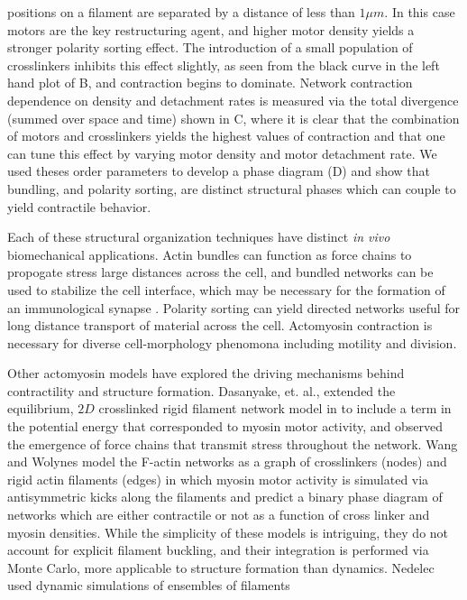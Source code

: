\documentclass[12pt]{article}
\begin{document}
positions on a filament are separated by a distance of less than $1\mu m$. 
In this case motors are the key restructuring agent, and higher motor density
yields a stronger polarity sorting effect. The introduction of a small 
population of crosslinkers inhibits this effect slightly, as seen from the black
curve in the left hand plot of B, and contraction begins to 
dominate. Network contraction dependence on density and detachment rates 
is measured via the total divergence (summed over space and time) 
shown in C, where it is clear that the combination of 
motors and crosslinkers yields the highest values of contraction and that one
can tune this effect by varying motor density and motor detachment rate. 
We used theses order parameters to develop a phase diagram (D)
and show that bundling, and polarity sorting, are distinct structural phases
which can couple to yield contractile behavior. 
\par
Each of these structural organization techniques have distinct {\em in vivo}
biomechanical applications. 
Actin bundles can function as force chains to propogate stress large distances
across the cell, and bundled networks can be used to stabilize the cell 
interface, which may be necessary for the formation of an immunological synapse 
\cite{comrie2015}. Polarity sorting can yield directed networks useful for long 
distance transport of 
material across the cell. Actomyosin contraction is necessary for diverse
cell-morphology phenomona including motility and division.
\par
Other actomyosin models have explored the driving mechanisms behind
contractility and structure formation. Dasanyake, et. al., extended the
equilibrium, $2D$ crosslinked rigid filament network model in \cite{head2003} to
include a term in the potential energy that corresponded to myosin motor
activity, and observed the emergence of force chains that transmit stress
throughout the network\cite{dasanyake2011}. Wang and Wolynes \cite{wang2012}
model the F-actin networks as a graph of crosslinkers (nodes) and rigid actin
filaments (edges) in which myosin motor activity is simulated via antisymmetric
kicks along the filaments and predict a binary phase diagram of networks which
are either contractile or not as a function of cross linker and myosin
densities. While the simplicity of these models is intriguing, they do not
account for explicit filament buckling, and their integration is performed via
Monte Carlo, more applicable to structure formation than dynamics.
Nedelec used dynamic simulations of ensembles of filaments
\end{document}
